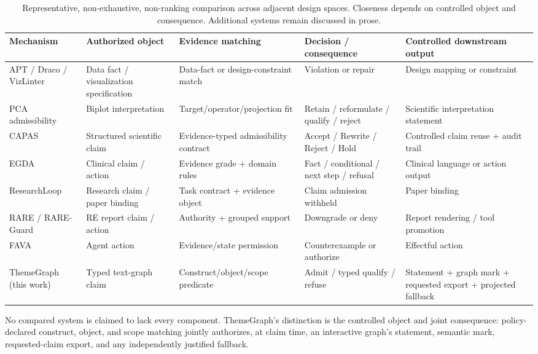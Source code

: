 \documentclass[manuscript,screen,review,anonymous]{acmart}
\begin{document}
\begin{table}[t]
  \caption{Representative, non-exhaustive, non-ranking comparison across adjacent design spaces. Closeness depends on controlled object and consequence. Additional systems remain discussed in prose.}
  \label{tab:prior-art}
  \centering
  \footnotesize
  \setlength{\tabcolsep}{2.5pt}
  \begin{tabular}{@{}p{}p{}p{}p{}p{}@{}}
    \toprule
    Mechanism & Authorized object & Evidence matching & Decision / consequence & Controlled downstream output \\
    \midrule
    APT / Draco / VizLinter \cite{mackinlay1986,moritz2019,chen2022} & Data fact / visualization specification & Data-fact or design-constraint match & Violation or repair & Design mapping or constraint \\
    PCA admissibility \cite{pinto2026} & Biplot interpretation & Target/operator/projection fit & Retain / reformulate / qualify / reject & Scientific interpretation statement \\
    CAPAS \cite{capas2026} & Structured scientific claim & Evidence-typed admissibility contract & Accept / Rewrite / Reject / Hold & Controlled claim reuse + audit trail \\
    EGDA \cite{lin2026egda} & Clinical claim / action & Evidence grade + domain rules & Fact / conditional / next step / refusal & Clinical language or action output \\
    ResearchLoop \cite{researchloop2026} & Research claim / paper binding & Task contract + evidence object & Claim admission withheld & Paper binding \\
    RARE / RARE-Guard \cite{rare2026} & RE report claim / action & Authority + grouped support & Downgrade or deny & Report rendering / tool promotion \\
    FAVA \cite{fava2026} & Agent action & Evidence/state permission & Counterexample or authorize & Effectful action \\
    ThemeGraph (this work) & Typed text-graph claim & Construct/object/scope predicate & Admit / typed qualify / refuse & Statement + graph mark + requested export + projected fallback \\
    \bottomrule
  \end{tabular}
\end{table}

No compared system is claimed to lack every component. ThemeGraph's distinction is the controlled object and joint consequence: policy-declared construct, object, and scope matching jointly authorizes, at claim time, an interactive graph's statement, semantic mark, requested-claim export, and any independently justified fallback.
\end{document}
